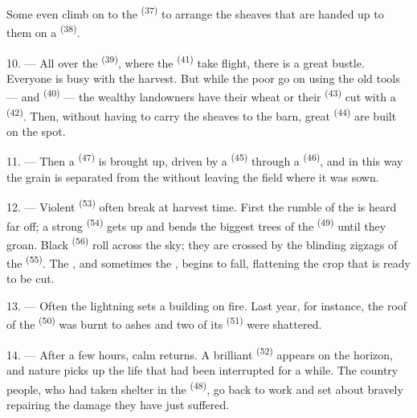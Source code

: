 Some even climb on to the  \textsuperscript{(37)} to arrange the sheaves that are
handed up to them on a  \textsuperscript{(38)}.

10. --- All over the  \textsuperscript{(39)}, where the 
\textsuperscript{(41)} take flight, there is a great bustle. Everyone is busy with the
harvest. But while the poor go on using the old tools ---
 and  \textsuperscript{(40)} --- the
wealthy landowners have their wheat or their  \textsuperscript{(43)} cut with a
 \textsuperscript{(42)}. Then, without having to carry the sheaves to
the barn, great  \textsuperscript{(44)} are built on the spot.

11. --- Then a  \textsuperscript{(47)} is brought up, driven by a
 \textsuperscript{(45)} through a
 \textsuperscript{(46)}, and in this way the grain is
separated from the  without leaving the field where it was sown.

\VUsaut{5.0mm}
\VUsaut{3.4mm}

12. --- Violent  \textsuperscript{(53)} often break at harvest time. First the
rumble of the  is heard far off; a strong
 \textsuperscript{(54)} gets up and bends the biggest trees of the
 \textsuperscript{(49)} until they groan. Black 
\textsuperscript{(56)} roll across the sky; they are crossed by the blinding zigzags of the
 \textsuperscript{(55)}. The , and sometimes the
, begins to fall, flattening the crop that is ready to be cut.

13. --- Often the lightning sets a building on fire. Last year, for instance, the roof of the
 \textsuperscript{(50)} was burnt to ashes and two of its 
\textsuperscript{(51)} were shattered.

14. --- After a few hours, calm returns. A brilliant  \textsuperscript{(52)}
appears on the horizon, and nature picks up the life that had been interrupted for a while.
The country people, who had taken shelter in the  \textsuperscript{(48)}, go back
to work and set about bravely repairing the damage they have just suffered.

